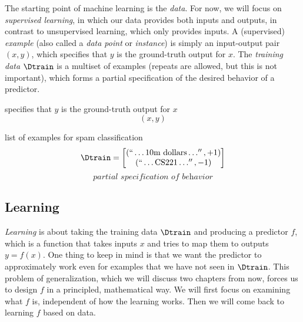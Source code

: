 The starting point of machine learning is the \textit{data}.
For now, we will focus on \textit{supervised learning}, in which our data provides both inputs and outputs, in contrast to unsupervised learning, which only provides inputs.
A (supervised) \textit{example} (also called a \textit{data point} or \textit{instance}) is simply an input-output pair $(x,y)$, which specifies that $y$ is the ground-truth output for $x$.
The \textit{training data} $\Dtrain$ is a multiset of examples (repeats are allowed, but this is not important), which forms a partial specification of the desired behavior of a predictor.

\begin{example} 
     specifies that $y$ is the ground-truth output for $x$
    \[
        (x,y)
    \]

     list of examples for spam classification
    \[
        \Dtrain = \begin{bmatrix}
            (``\ldots10\text{m dollars}\ldots'',+1) \\
            (``\ldots \text{CS}221\ldots'',-1)
        \end{bmatrix}
    \]
    \[
        \textit{partial specification of behavior}
    \]
\end{example}



\subsection{Learning} %
\label{sub:learning}


\textit{Learning} is about taking the training data $\Dtrain$ and producing a predictor $f$, which is a function that takes inputs $x$ and tries to map them to outputs $y=f(x)$. One thing to keep in mind is that we want the predictor to approximately work even for examples that we have not seen in $\Dtrain$. This problem of generalization, which we will discuss two chapters from now, forces us to design $f$ in a principled, mathematical way.
We will first focus on examining what $f$ is, independent of how the learning works. Then we will come back to learning $f$ based on data.

